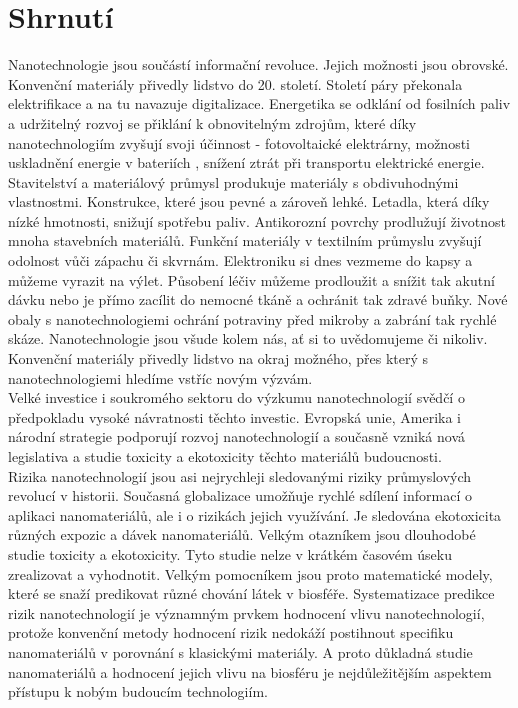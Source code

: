 \chapter{Shrnutí}

Nanotechnologie jsou součástí informační  revoluce. Jejich možnosti jsou obrovské. Konvenční materiály přivedly lidstvo do 20. století. Století páry překonala elektrifikace a na tu navazuje digitalizace. Energetika se odklání od fosilních paliv a udržitelný rozvoj se přiklání k obnovitelným zdrojům, které díky nanotechnologiím zvyšují svoji účinnost - fotovoltaické elektrárny, možnosti uskladnění energie v bateriích \cite{he3da_baterie}, snížení ztrát při transportu elektrické energie. Stavitelství a materiálový průmysl produkuje materiály s obdivuhodnými vlastnostmi. Konstrukce, které jsou pevné a zároveň lehké. Letadla, která díky nízké hmotnosti, snižují spotřebu paliv. Antikorozní povrchy prodlužují životnost mnoha stavebních materiálů. Funkční materiály v textilním průmyslu zvyšují odolnost vůči zápachu či skvrnám. Elektroniku si dnes vezmeme do kapsy a můžeme vyrazit na výlet. Působení léčiv můžeme prodloužit a snížit tak akutní dávku nebo je přímo zacílit do nemocné tkáně a ochránit tak zdravé buňky. Nové obaly s nanotechnologiemi ochrání potraviny před mikroby a zabrání tak rychlé skáze. Nanotechnologie jsou všude kolem nás, ať si to uvědomujeme či nikoliv. Konvenční materiály přivedly lidstvo na okraj možného, přes který s nanotechnologiemi hledíme vstříc novým výzvám.\\

Velké investice i soukromého sektoru do výzkumu nanotechnologií svědčí o předpokladu vysoké návratnosti těchto investic. Evropská unie, Amerika i národní strategie podporují rozvoj nanotechnologií a současně vzniká nová legislativa a studie toxicity a ekotoxicity těchto materiálů budoucnosti.\\

Rizika nanotechnologií jsou asi nejrychleji sledovanými riziky průmyslových revolucí v historii. Současná globalizace umožňuje rychlé sdílení informací o aplikaci nanomateriálů, ale i o rizikách jejich využívání. Je sledována ekotoxicita různých expozic a dávek nanomateriálů. Velkým otazníkem jsou dlouhodobé studie toxicity a ekotoxicity. Tyto studie nelze v krátkém časovém úseku zrealizovat a vyhodnotit. Velkým pomocníkem jsou proto matematické modely, které se snaží predikovat různé chování látek v biosféře. Systematizace predikce rizik nanotechnologií je významným prvkem hodnocení vlivu nanotechnologií, protože konvenční metody hodnocení rizik nedokáží postihnout specifiku nanomateriálů v porovnání s klasickými materiály. A proto důkladná studie nanomateriálů a hodnocení jejich vlivu na biosféru je nejdůležitějším aspektem přístupu k nobým budoucím technologiím.\\



